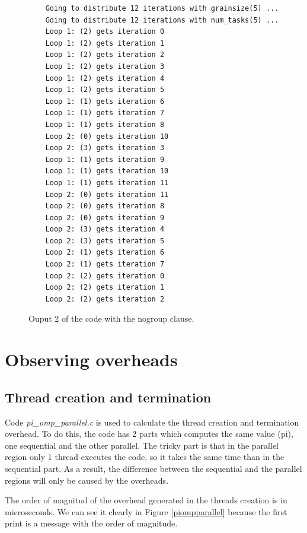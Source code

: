 \documentclass[12pt, a4paper]{article}
\begin{document}
\begin{figure}[H]
	\begin{lstlisting}
	Going to distribute 12 iterations with grainsize(5) ...
	Going to distribute 12 iterations with num_tasks(5) ...
	Loop 1: (2) gets iteration 0
	Loop 1: (2) gets iteration 1
	Loop 1: (2) gets iteration 2
	Loop 1: (2) gets iteration 3
	Loop 1: (2) gets iteration 4
	Loop 1: (2) gets iteration 5
	Loop 1: (1) gets iteration 6
	Loop 1: (1) gets iteration 7
	Loop 1: (1) gets iteration 8
	Loop 2: (0) gets iteration 10
	Loop 2: (3) gets iteration 3
	Loop 1: (1) gets iteration 9
	Loop 1: (1) gets iteration 10
	Loop 1: (1) gets iteration 11
	Loop 2: (0) gets iteration 11
	Loop 2: (0) gets iteration 8
	Loop 2: (0) gets iteration 9
	Loop 2: (3) gets iteration 4
	Loop 2: (3) gets iteration 5
	Loop 2: (1) gets iteration 6
	Loop 2: (1) gets iteration 7
	Loop 2: (2) gets iteration 0
	Loop 2: (2) gets iteration 1
	Loop 2: (2) gets iteration 2
	\end{lstlisting}
	
	\caption{Ouput 2 of the code with the nogroup clause.}
	\label{Ouput 2 of the code with the nogroup clause.}
\end{figure}

\section{Observing overheads}

\subsection{Thread creation and termination}

Code \textit{pi\_omp\_parallel.c} is used to calculate the thread creation and termination overhead. To do this, the code has 2 parts which computes the same value (pi), one sequential and the other parallel. The tricky part is that in the parallel region only 1 thread executes the code, so it takes the same time than in the sequential part. As a result, the difference between the sequential and the parallel regions will only be caused by the overheads.

The order of magnitud of the overhead generated in the threads creation is in microseconds. We can see it clearly in Figure \ref{piompparallel} because the first print is a message with the order of magnitude.
\end{document}
